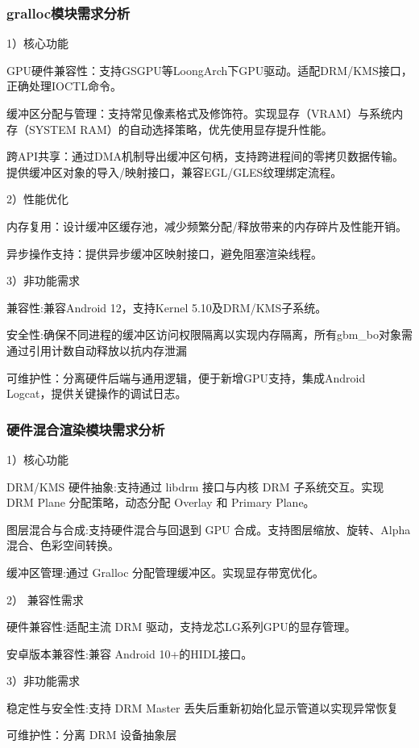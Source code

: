 \subsubsection{gralloc模块需求分析}
1）核心功能

    ​GPU硬件兼容性​：支持GSGPU等LoongArch下GPU驱动。适配DRM/KMS接口，正确处理IOCTL命令。

    ​缓冲区分配与管理​：支持常见像素格式及修饰符。实现显存（VRAM）与系统内存（SYSTEM RAM）的自动选择策略，优先使用显存提升性能。

    ​跨API共享​：通过DMA机制导出缓冲区句柄，支持跨进程间的零拷贝数据传输。提供缓冲区对象的导入/映射接口，兼容EGL/GLES纹理绑定流程。

2）性能优化

    ​内存复用​​：设计缓冲区缓存池，减少频繁分配/释放带来的内存碎片及性能开销。

    ​异步操作支持​：提供异步缓冲区映射接口，避免阻塞渲染线程。

3）非功能需求
        
    兼容性:兼容Android 12，支持Kernel 5.10及DRM/KMS子系统。
        
    安全性:​确保不同进程的缓冲区访问权限隔离以实现内存隔离，所有gbm\_bo对象需通过引用计数自动释放以抗内存泄漏
        
    可维护性：分离硬件后端与通用逻辑，便于新增GPU支持，集成Android Logcat，提供关键操作的调试日志。

\subsubsection{硬件混合渲染模块需求分析}

1）核心功能

DRM/KMS 硬件抽象​:支持通过 libdrm 接口与内核 DRM 子系统交互。实现 DRM Plane 分配策略，动态分配 Overlay 和 Primary Plane。

​图层混合与合成​:支持硬件混合与回退到 GPU 合成。支持图层缩放、旋转、Alpha 混合、色彩空间转换。

​缓冲区管理​:通过 Gralloc 分配管理缓冲区。实现显存带宽优化。

2） 兼容性需求

​硬件兼容性​:适配主流 DRM 驱动，支持龙芯LG系列GPU的显存管理。

​安卓版本兼容性​:兼容 Android 10+的HIDL接口。

3）非功能需求

稳定性与安全性:支持 DRM Master 丢失后重新初始化显示管道以实现异常恢复

可维护性：​分离 DRM 设备抽象层


